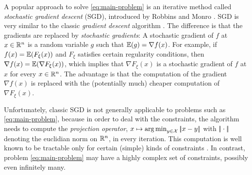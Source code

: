 A popular approach to solve \eqref{eq:main-problem} is an iterative method called \textit{stochastic gradient
descent} (SGD), introduced by Robbins and Monro \cite{robbins1951stochastic}.
SGD is very similar to the classic \textit{gradient descent} algorithm \cite{boyd2004convex,nocedal2006numerical}.
The difference is that the gradients are replaced
by \textit{stochastic gradients}: A stochastic gradient of $f$ at $x\in\mathbb{R}^n$ is a
random variable $g$ such that $\mathbb{E}(g) = \nabla f(x)$. For example, if $f(x) = \mathbb{E}(F_\xi(x))$ and $F_\xi$
satisfies certain regularity conditions, then
$\nabla f(x) = \mathbb{E}(\nabla F_\xi(x))$, which implies that $\nabla F_\xi(x)$ is a stochastic gradient of $f$
at $x$ for every $x\in\mathbb{R}^n$.
The advantage is that the computation of the gradient $\nabla f(x)$ is replaced with the (potentially much) cheaper
computation of $\nabla F_\xi(x)$.

Unfortunately, classic SGD is not generally applicable to problems such as \eqref{eq:main-problem},
because in order to deal with the constraints, the algorithm
needs to compute the \textit{projection operator}, $x\mapsto \operatorname*{arg\,min}_{y\in \mathcal{X}} |\!|x - y|\!|$
with $|\!|\cdot|\!|$ denoting the euclidian norm on $\mathbb{R}^n$,
in every iteration.
This computation is well known to
be tractable only for certain (simple) kinds of constraints \cite{duchi2018introductory}.
In contrast, problem \eqref{eq:main-problem} may have a highly complex set of constraints, possibly even infinitely many.

